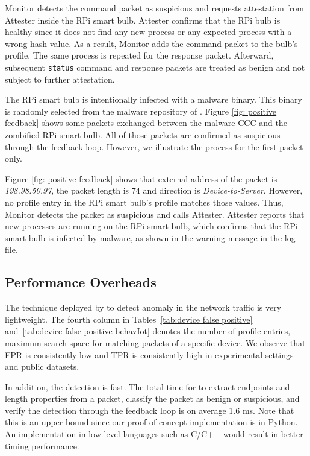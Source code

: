 Monitor detects the command packet as suspicious and requests attestation from Attester inside the RPi smart bulb. Attester confirms that the RPi bulb is healthy since it does not find any new process or any expected process with a wrong hash value. As a result, Monitor adds the command packet to the bulb's profile. The same process is repeated for the response packet. Afterward, subsequent \texttt{status} command and response packets are treated as benign and not subject to further attestation.

The RPi smart bulb is intentionally infected with a malware binary. This binary is randomly selected from the malware repository of \cite{alrawi2021circle}.  Figure \ref{fig: positive feedback} shows some packets exchanged between the malware CCC and the zombified RPi smart bulb. All of those packets are confirmed as suspicious through the feedback loop. However, we illustrate the process for the first packet only.

Figure \ref{fig: positive feedback} shows that external address of the packet is \textit{198.98.50.97}, the packet length is 74 and direction is \textit{Device-to-Server}. However, no profile entry in the RPi smart bulb's profile matches those values. Thus, Monitor detects the packet as suspicious and calls Attester. Attester reports that new processes are running on the RPi smart bulb, which confirms that the RPi smart bulb is infected by malware, as shown in the warning message in the log file. 

\subsection{Performance Overheads}\label{subsec:performance-overheads}
The \ta{} technique deployed by \system{} to detect anomaly in the network traffic is very lightweight. The fourth column in Tables~\ref{tab:device false positive} and~\ref{tab:device false positive behavIot} denotes the number of profile entries, \ie{} maximum search space for matching packets of a specific device.
We observe that FPR is consistently low and TPR is consistently high in experimental settings and public datasets. 

In addition, the detection is fast. The total time for \system{} to extract endpoints and length properties from a packet, classify the packet as benign or suspicious, and verify the detection through the feedback loop is on average 1.6 ms. %
Note that this is an upper bound since our proof of concept implementation is in Python. An implementation in low-level languages such as C/C++ would result in better timing performance. 

